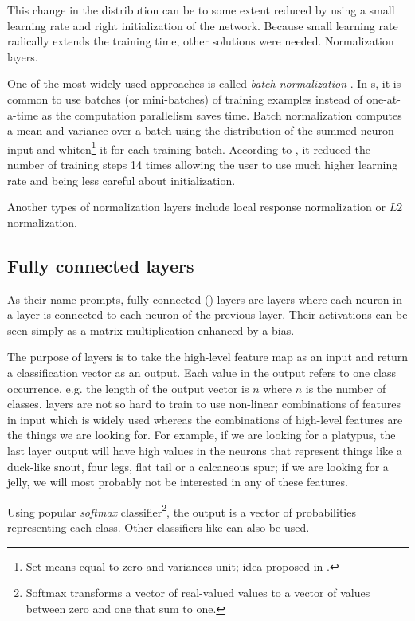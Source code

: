 This change in the distribution can be to some extent reduced by using a small 
learning rate and right initialization of the network. Because small learning 
rate radically extends the training time, other solutions were needed. 
Normalization layers. 

One of the most widely used approaches is called \textit{batch normalization} 
\cite{batch-norm}. In s, it is common to use batches (or mini-batches) 
of training examples instead of one-at-a-time as the computation parallelism 
saves time. Batch normalization computes a mean and variance over a batch using 
the distribution of the summed neuron input and whiten\footnote{Set means equal 
to zero and variances unit; idea proposed in \cite{tricks}.} it for each 
training batch. According to \cite{batch-norm}, it reduced the number of 
training steps 14 times allowing the user to use much higher learning rate and 
being less careful about initialization.

Another types of normalization layers include local response normalization or 
$L2$ normalization.

\subsection{Fully connected layers}
\label{fc-layers}

As their name prompts, fully connected () layers are layers where each 
neuron in a layer is connected to each neuron of the previous layer. Their 
activations can be seen simply as a matrix multiplication enhanced by a bias.  

The purpose of  layers is to take the high-level feature map as an input 
and return a classification vector as an output. Each value in the output refers 
to one class occurrence, e.g. the length of the output vector is $n$ where $n$ 
is the number of classes.  layers are not so hard to train to use 
non-linear combinations of features in input which is widely used whereas the 
combinations of high-level features are the things we are looking for. For 
example, if we are looking for a platypus, the last layer output will have high 
values in the neurons that represent things like a duck-like snout, four legs, 
flat tail or a calcaneous spur; if we are looking for a jelly, we will most 
probably not be interested in any of these features. 

Using popular \textit{softmax} classifier\footnote{Softmax transforms a vector 
of real-valued values to a vector of values between zero and one that sum to 
one.}, the output is a vector of probabilities representing each class. Other 
classifiers like  can also be used. 

